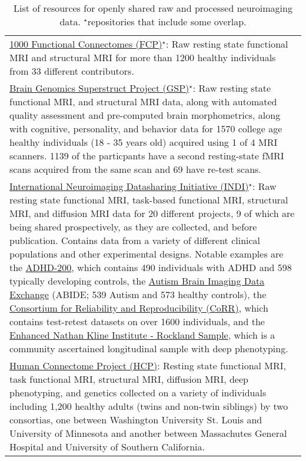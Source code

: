 \renewcommand{\arraystretch}{1.5}

\begin{table}[h!]
\caption{List of resources for openly shared raw and processed neuroimaging data. $^{\star}$repositories that include some overlap.}
      \begin{tabular}{L{5.5in}}
        \hline
        \href{http://fcon_1000.projects.nitrc.org}{1000 Functional Connectomes (FCP)}$^{\star}$: Raw resting state functional MRI and structural MRI for more than 1200 healthy individuals from 33 different contributors. \\ 
		\href{https://thedata.harvard.edu/dvn/dv/GSP}{Brain Genomics Superstruct Project (GSP)}$^{\star}$: Raw resting state functional MRI, and structural MRI data, along with automated quality assessment and pre-computed brain morphometrics, along with cognitive, personality, and behavior data for 1570 college age healthy individuals (18 - 35 years old) acquired using 1 of 4 MRI scanners. 1139 of the particpants have a second resting-state fMRI scans acquired from the same scan and 69 have re-test scans.\\
		\href{http://fcon_1000.projects.nitrc.org}{International Neuroimaging Datasharing Initiative (INDI)}$^{\star}$: Raw resting state functional MRI, task-based functional MRI, structural MRI, and diffusion MRI data for 20 different projects, 9 of which are being shared prospectively, as they are collected, and before publication. Contains data from a variety of different clinical populations and other experimental designs. Notable examples are the \href{http://fcon_1000.projects.nitrc.org/indi/adhd200}{ADHD-200}, which contains 490 individuals with ADHD and 598 typically developing controls, the \href{http://fcon_1000.projects.nitrc.org/indi/abide}{Autism Brain Imaging Data Exchange} (ABIDE; 539 Autism and 573 healthy controls), the \href{http://fcon_1000.projects.nitrc.org/indi/CoRR/html/}{Consortium for Reliability and Reproducibility (CoRR)}, which contains test-retest datasets on over 1600 individuals, and the \href{http://fcon_1000.projects.nitrc.org/indi/enhanced/}{Enhanced Nathan Kline Institute - Rockland Sample}, which is a community ascertained longitudinal sample with deep phenotyping. \\
        \href{http://www.humanconnectomeproject.org/}{Human Connectome Project (HCP)}: Resting state functional MRI, task functional MRI, structural MRI, diffusion MRI, deep phenotyping, and genetics collected on a variety of individuals including 1,200 healthy adults (twins and non-twin siblings) by two consortias, one between Washington University St. Louis and University of Minnesota and another between Massachutes General Hospital and University of Southern California.\\

\end{tabular}
\end{table}
